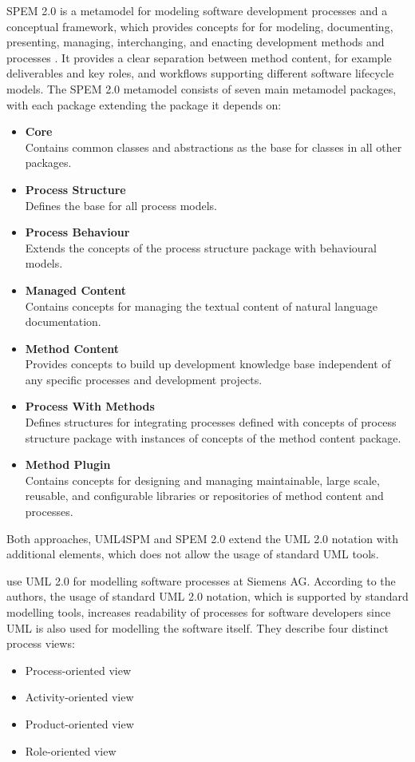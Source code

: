 \ac{SPEM} 2.0 is a metamodel for modeling software development processes and a conceptual framework, which provides concepts for for modeling, documenting, presenting, managing, interchanging, and enacting development methods and processes \citep{Group:2008aa}. It provides a clear separation between method content, for example deliverables and key roles, and workflows supporting different software lifecycle models. The \ac{SPEM} 2.0 metamodel consists of seven main metamodel packages, with each package extending the package it depends on:
\begin{itemize}
	\item \textbf{Core}\\
	Contains common classes and abstractions as the base for classes in all other packages.
	\item \textbf{Process Structure}\\
	Defines the base for all process models.
	\item \textbf{Process Behaviour}\\
	Extends the concepts of the process structure package with behavioural models.
	\item \textbf{Managed Content}\\
	Contains concepts for managing the textual content of natural language documentation.
	\item \textbf{Method Content}\\
	Provides concepts to build up development knowledge base independent of any specific processes and development projects.
	\item \textbf{Process With Methods}\\
	Defines structures for integrating processes defined with concepts of process structure package with instances of concepts of the method content package.
	\item \textbf{Method Plugin}\\
	Contains concepts for designing and managing maintainable, large scale, reusable, and configurable libraries or repositories of method content and processes.
\end{itemize}

Both approaches, \ac{UML4SPM} and \ac{SPEM} 2.0 extend the \ac{UML} 2.0 notation with additional elements, which does not allow the usage of standard \ac{UML} tools.

\cite{Dietrich:2013aa} use \ac{UML} 2.0 for modelling software processes at Siemens AG. According to the authors, the usage of standard UML 2.0 notation, which is supported by standard modelling tools, increases readability of processes for software developers since UML is also used for modelling the software itself.
They describe four distinct process views: 
\begin{itemize}
	\item Process-oriented view
	\item Activity-oriented view
	\item Product-oriented view
	\item Role-oriented view
\end{itemize}

